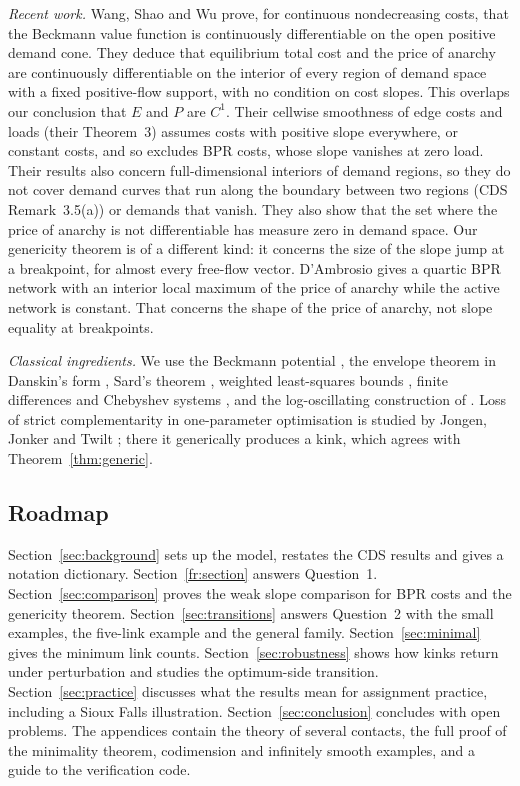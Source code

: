 \emph{Recent work.} Wang, Shao and Wu \cite{WSW2026} prove, for continuous nondecreasing costs, that the Beckmann value function is continuously differentiable on the open positive demand cone. They deduce that equilibrium total cost and the price of anarchy are continuously differentiable on the interior of every region of demand space with a fixed positive-flow support, with no condition on cost slopes. This overlaps our conclusion that $E$ and $P$ are $C^1$. Their cellwise smoothness of edge costs and loads (their Theorem~3) assumes costs with positive slope everywhere, or constant costs, and so excludes BPR costs, whose slope vanishes at zero load. Their results also concern full-dimensional interiors of demand regions, so they do not cover demand curves that run along the boundary between two regions (CDS Remark~3.5(a)) or demands that vanish. They also show that the set where the price of anarchy is not differentiable has measure zero in demand space. Our genericity theorem is of a different kind: it concerns the size of the slope jump at a breakpoint, for almost every free-flow vector. D'Ambrosio \cite{DAmbrosio2026} gives a quartic BPR network with an interior local maximum of the price of anarchy while the active network is constant. That concerns the shape of the price of anarchy, not slope equality at breakpoints.

\emph{Classical ingredients.} We use the Beckmann potential \cite{BMW1956}, the envelope theorem in Danskin's form \cite{Danskin1966}, Sard's theorem \cite{Sard1942}, weighted least-squares bounds \cite{Stewart1989,Forsgren1996}, finite differences and Chebyshev systems \cite{GLT2012,Karlin1968,deBoor2005,BT2004}, and the log-oscillating construction of \cite{CB2020}. Loss of strict complementarity in one-parameter optimisation is studied by Jongen, Jonker and Twilt \cite{JongenJonkerTwilt1986}; there it generically produces a kink, which agrees with Theorem~\ref{thm:generic}.

\subsection{Roadmap}

Section~\ref{sec:background} sets up the model, restates the CDS results and gives a notation dictionary. Section~\ref{fr:section} answers Question~1. Section~\ref{sec:comparison} proves the weak slope comparison for BPR costs and the genericity theorem. Section~\ref{sec:transitions} answers Question~2 with the small examples, the five-link example and the general family. Section~\ref{sec:minimal} gives the minimum link counts. Section~\ref{sec:robustness} shows how kinks return under perturbation and studies the optimum-side transition. Section~\ref{sec:practice} discusses what the results mean for assignment practice, including a Sioux Falls illustration. Section~\ref{sec:conclusion} concludes with open problems. The appendices contain the theory of several contacts, the full proof of the minimality theorem, codimension and infinitely smooth examples, and a guide to the verification code.
